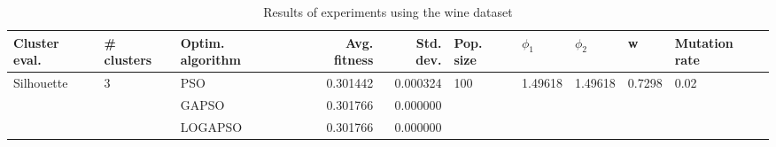 \begin{table}
\centering
\caption{Results of experiments using the wine dataset}
\begin{tabular}{lllrrlllll}
\toprule
              Cluster eval. &        \# clusters & Optim. algorithm &  Avg. fitness &  Std. dev. &            Pop. size &               $\phi_{1}$ &               $\phi_{2}$ &                       w &         Mutation rate \\
\midrule
\multirow{3}{*}{Silhouette} & \multirow{3}{*}{3} &              PSO &      0.301442 &   0.000324 & \multirow{3}{*}{100} & \multirow{3}{*}{1.49618} & \multirow{3}{*}{1.49618} & \multirow{3}{*}{0.7298} & \multirow{3}{*}{0.02} \\
                            &                    &            GAPSO &      0.301766 &   0.000000 &                      &                          &                          &                         &                       \\
                            &                    &          LOGAPSO &      0.301766 &   0.000000 &                      &                          &                          &                         &                       \\
\bottomrule
\end{tabular}
\end{table}
